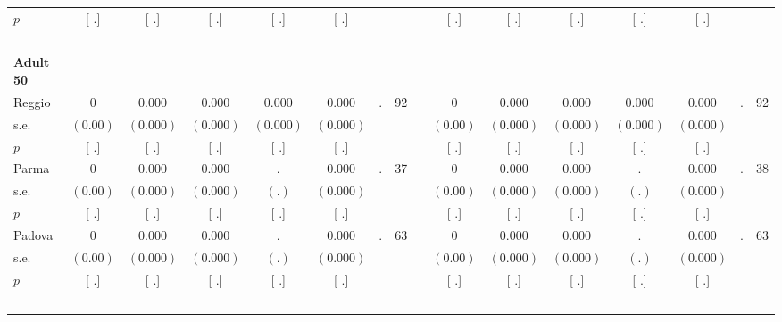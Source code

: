\begin{longtable}{L{8em} c c c c c c c p{1em} c c c c c c c}
\quad \quad \quad \quad $ p$ & [        .] & [        .] & [        .] & [        .] & [        .] & & & & [        .] & [        .] & [        .] & [        .] & [        .] & &  \\[1em]
~\\[1em]
\quad \quad \textbf{Adult 50} & & & & & & & & & & & & & & & \\* 
\quad \quad \quad Reggio& 0 &     0.000 &     0.000 &     0.000 &     0.000 &         . &        92 & & 0 &     0.000 &     0.000 &     0.000 &     0.000 &         . &        92  \\*
\quad \quad \quad \quad s.e.& $ (     0.00)$ & $ (    0.000)$ & $ (    0.000)$ & $ (    0.000)$ & $ (    0.000)$ & & & & $ (     0.00)$ & $ (    0.000)$ & $ (    0.000)$ & $ (    0.000)$ & $ (    0.000)$ & &  \\*
\quad \quad \quad \quad $ p$ & [        .] & [        .] & [        .] & [        .] & [        .] & & & & [        .] & [        .] & [        .] & [        .] & [        .] & &  \\[1em]
\quad \quad \quad Parma& 0 &     0.000 &     0.000 &         . &     0.000 &         . &        37 & & 0 &     0.000 &     0.000 &         . &     0.000 &         . &        38  \\*
\quad \quad \quad \quad s.e.& $ (     0.00)$ & $ (    0.000)$ & $ (    0.000)$ & $ (        .)$ & $ (    0.000)$ & & & & $ (     0.00)$ & $ (    0.000)$ & $ (    0.000)$ & $ (        .)$ & $ (    0.000)$ & &  \\*
\quad \quad \quad \quad $ p$ & [        .] & [        .] & [        .] & [        .] & [        .] & & & & [        .] & [        .] & [        .] & [        .] & [        .] & &  \\[1em]
\quad \quad \quad Padova& 0 &     0.000 &     0.000 &         . &     0.000 &         . &        63 & & 0 &     0.000 &     0.000 &         . &     0.000 &         . &        63  \\*
\quad \quad \quad \quad s.e.& $ (     0.00)$ & $ (    0.000)$ & $ (    0.000)$ & $ (        .)$ & $ (    0.000)$ & & & & $ (     0.00)$ & $ (    0.000)$ & $ (    0.000)$ & $ (        .)$ & $ (    0.000)$ & &  \\*
\quad \quad \quad \quad $ p$ & [        .] & [        .] & [        .] & [        .] & [        .] & & & & [        .] & [        .] & [        .] & [        .] & [        .] & &  \\[1em]
~\\[1em]
\end{longtable}